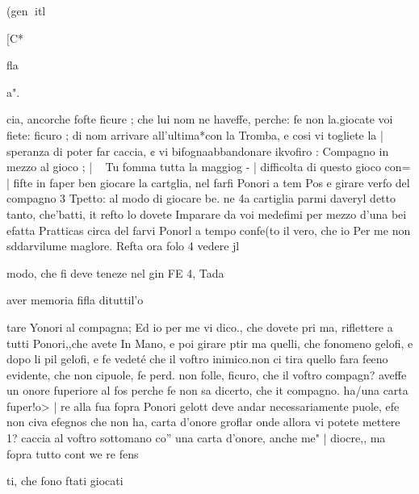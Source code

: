 \documentclass[12pt,a6paper]{article}
\begin{document}
 

 

 

 

 

 

 

 

 

 

 

(gen
itl

[C*

fla

a".

cia, ancorche fofte ficure ; che
lui nom ne haveffe, perche: fe
non la.giocate voi fiete: ficuro ;
di nom arrivare all’ultima*con
la Tromba, e cosi vi togliete la |
speranza di poter far caccia, ¢
vi bifognaabbandonare ikvofiro :
Compagno in mezzo al gioco ; |
~ Tu fomma tutta la maggiog - |
difficolta di questo gioco con= |
fifte in faper ben giocare la cartglia, nel farfi Ponori a tem Pos
e girare verfo del compagno 3
Tpetto: al modo di giocare be.
ne 4a cartiglia parmi daveryl
detto tanto, che'batti, it refto lo
dovete Imparare da voi medefimi per mezzo d’una bei efatta
Pratticas circa del farvi Ponorl
a tempo confe(to il vero, che io
Per me non sddarvilume maglore. Refta ora folo 4 vedere jl

modo, che fi deve teneze nel gin
FE 4, Tada

 

 
 

 

 

 

aver memoria fifla dituttil’o

 

tare Yonori al compagna; Ed io
per me vi dico., che dovete pri
ma, riflettere a tutti Ponori,,che
avete In Mano, e poi girare ptir
ma quelli, che fonomeno gelofi,
e dopo li pil gelofi, e fe vedeté
che il voftro inimico.non ci tira
quello fara feeno evidente, che
non cipuole, fe perd. non folle,
ficuro, che il voftro compagn?
aveffe un onore fuperiore al fos
perche fe non sa dicerto, che it
compagno. ha/una carta fuper!o> |
re alla fua fopra Ponori gelott
deve andar necessariamente
puole, efe non civa efegnos
che non ha, carta d’onore groflar
onde allora vi potete mettere 1?
caccia al voftro sottomano co”
una carta d’onore, anche me" |
diocre,, ma fopra tutto cont
we re
fens

 

ti, che fono ftati giocati
\end{document}

